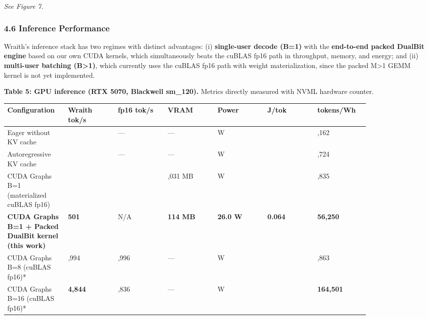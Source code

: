\emph{See Figure 7.}

\subsubsection{4.6 Inference Performance}\label{inference-performance}

Wraith's inference stack has two regimes with distinct advantages: (i)
\textbf{single-user decode (B=1)} with the \textbf{end-to-end packed
DualBit engine} based on our own CUDA kernels, which simultaneously
beats the cuBLAS fp16 path in throughput, memory, and energy; and (ii)
\textbf{multi-user batching (B\textgreater1)}, which currently uses the
cuBLAS fp16 path with weight materialization, since the packed
M\textgreater1 GEMM kernel is not yet implemented.

\textbf{Table 5: GPU inference (RTX 5070, Blackwell sm\_120).} Metrics
directly measured with NVML hardware counter.

{\def\LTcaptype{none} %
{\footnotesize\setlength{\tabcolsep}{3pt}
\begin{longtable}[]{@{}>{\raggedright\arraybackslash}p{0.123\linewidth}>{\raggedright\arraybackslash}p{0.123\linewidth}>{\raggedright\arraybackslash}p{0.123\linewidth}>{\raggedright\arraybackslash}p{0.123\linewidth}>{\raggedright\arraybackslash}p{0.123\linewidth}>{\raggedright\arraybackslash}p{0.123\linewidth}>{\raggedright\arraybackslash}p{0.123\linewidth}@{}}
\toprule\noalign{}
Configuration & Wraith tok/s & fp16 tok/s & VRAM & Power & J/tok & tokens/Wh \\
\midrule\noalign{}
\endhead
\bottomrule\noalign{}
\endlastfoot
Eager without KV cache & 43.9 & --- & --- & 135.9 W & 3.098 & 1,162 \\
Autoregressive KV cache & 57.1 & --- & --- & 55.2 W & 0.967 & 3,724 \\
CUDA Graphs B=1 (materialized cuBLAS fp16) & 387 & 387 & 1,031 MB & 38.8
W & 0.084 & 42,835 \\
\textbf{CUDA Graphs B=1 + Packed DualBit kernel (this work)} &
\textbf{501} & N/A & \textbf{114 MB} & \textbf{26.0 W} & \textbf{0.064}
& \textbf{56,250} \\
CUDA Graphs B=8 (cuBLAS fp16)* & 2,994 & 2,996 & --- & 81.7 W & 0.027 &
131,863 \\
CUDA Graphs B=16 (cuBLAS fp16)* & \textbf{4,844} & 4,836 & --- & 105.9 W
& 0.022 & \textbf{164,501} \\
\end{longtable}
}
}

